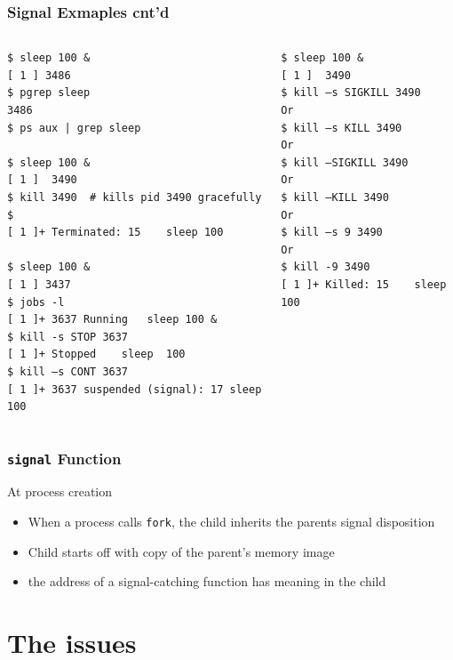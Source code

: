 \documentclass[newPxFont,sthlmFooter,nooffset]{beamer}
\begin{document}
\begin{frame}[fragile,t]
  \frametitle{Signal Exmaples cnt'd}
\begin{columns}[t]
\begin{column}{0.5\linewidth}
{\scriptsize
\begin{verbatim}
$ sleep 100 &
[ 1 ] 3486
$ pgrep sleep
3486
$ ps aux | grep sleep

$ sleep 100 &
[ 1 ]  3490
$ kill 3490  # kills pid 3490 gracefully
$ 
[ 1 ]+ Terminated: 15    sleep 100

$ sleep 100 &
[ 1 ] 3437
$ jobs -l
[ 1 ]+ 3637 Running   sleep 100 &
$ kill -s STOP 3637
[ 1 ]+ Stopped    sleep  100
$ kill –s CONT 3637
[ 1 ]+ 3637 suspended (signal): 17 sleep 100
\end{verbatim}
}  
\end{column}
\begin{column}{0.5\linewidth}
{\scriptsize
\begin{verbatim}
$ sleep 100 &
[ 1 ]  3490
$ kill –s SIGKILL 3490
Or
$ kill –s KILL 3490
Or
$ kill –SIGKILL 3490
Or 
$ kill –KILL 3490
Or
$ kill –s 9 3490
Or
$ kill -9 3490
[ 1 ]+ Killed: 15    sleep 100
\end{verbatim}
} 
\end{column}
\end{columns}


\end{frame}





\begin{frame}[t]
  \frametitle{\texttt{signal} Function}
At process creation
\begin{itemize}
\item When a process calls \texttt{fork}, the child inherits the parents signal disposition
\item Child starts off with copy of the parent's memory image
\item the address of a signal-catching function has meaning in the child
\end{itemize}
\end{frame}



\section{The issues}
\end{document}
